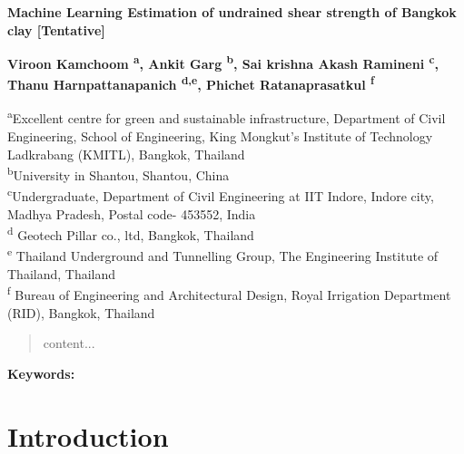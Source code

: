\documentclass[12pt,a4paper]{article}
\begin{document}
	\linenumbers
	
	\begin{justify}
		\textbf{\Large
			Machine Learning Estimation of undrained shear strength of Bangkok clay [Tentative] 
		}
	\end{justify}
	
	\begin{flushleft}
		\textbf{Viroon Kamchoom \textsuperscript{a}, Ankit Garg \textsuperscript{b}, Sai krishna Akash Ramineni \textsuperscript{c}, Thanu Harnpattanapanich \textsuperscript{d,e}, Phichet Ratanaprasatkul \textsuperscript{f}}
	\end{flushleft}
	
	\begin{flushleft}
		{\small {\textsuperscript{a}Excellent centre for green and sustainable infrastructure, Department of Civil Engineering, School of Engineering, King Mongkut's Institute of Technology Ladkrabang (KMITL), Bangkok, Thailand \\ 
				\textsuperscript{b}University in Shantou, Shantou, China \\ 
				\textsuperscript{c}Undergraduate, Department of Civil Engineering at IIT Indore, Indore city, Madhya Pradesh, Postal code- 453552, India \\
				\textsuperscript{d} Geotech Pillar co., ltd, Bangkok, Thailand \\
				\textsuperscript{e} Thailand Underground and Tunnelling Group, The Engineering Institute of Thailand, Thailand \\
				\textsuperscript{f} Bureau of Engineering and Architectural Design, Royal Irrigation Department (RID), Bangkok, Thailand \\
		}}
	\end{flushleft}
	
	\begin{abstract}
		content...
	\end{abstract}
	
	\hspace{0.4cm} \textbf{Keywords:} 
	
	\section{Introduction}
	
\end{document}
